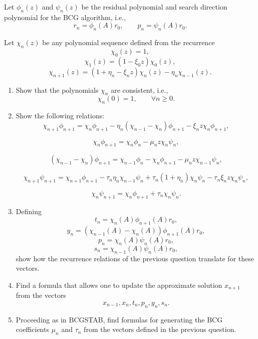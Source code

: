 \documentclass{ctexart}
\begin{document}
\begin{problem}\label{pro:3}
  Let $\phi_n(z)$ and $\psi_n(z)$ be the residual polynomial and search direction polynomial for the BCG algorithm, i.e.,
  \[
    r_n=\phi_n(A)r_0,
    \qquad
    p_n=\psi_n(A)r_0.
  \]

  Let $\chi_n(z)$ be any polynomial sequence defined from the recurrence
  \[
    \chi_0(z)=1,
  \]
  \[
    \chi_1(z)=(1-\xi_0 z)\chi_0(z),
  \]
  \[
    \chi_{n+1}(z)
    =
    (1+\eta_n-\xi_n z)\chi_n(z)-\eta_n\chi_{n-1}(z).
  \]

  \begin{enumerate}[label=(\alph*)]

    \item
      Show that the polynomials $\chi_n$ are consistent, i.e.,
      \[
        \chi_n(0)=1,
        \qquad \forall n\ge0.
      \]

    \item
      Show the following relations:
      \[
        \chi_{n+1}\phi_{n+1}
        =
        \chi_n\phi_{n+1}
        -\eta_n(\chi_{n-1}-\chi_n)\phi_{n+1}
        -\xi_n z\chi_n\phi_{n+1},
      \]

      \[
        \chi_n\phi_{n+1}
        =
        \chi_n\phi_n
        -\mu_n z\chi_n\psi_n,
      \]

      \[
        (\chi_{n-1}-\chi_n)\phi_{n+1}
        =
        \chi_{n-1}\phi_n
        -\chi_n\phi_{n+1}
        -\mu_n z\chi_{n-1}\psi_n,
      \]

      \[
        \chi_{n+1}\psi_{n+1}
        =
        \chi_{n+1}\phi_{n+1}
        -\tau_n\eta_n\chi_{n-1}\psi_n
        +\tau_n(1+\eta_n)\chi_n\psi_n
        -\tau_n\xi_n z\chi_n\psi_n,
      \]

      \[
        \chi_n\psi_{n+1}
        =
        \chi_n\phi_{n+1}
        +\tau_n\chi_n\psi_n.
      \]

    \item
      Defining
      \[
        t_n=\chi_n(A)\phi_{n+1}(A)r_0,
      \]
      \[
        y_n=(\chi_{n-1}(A)-\chi_n(A))\phi_{n+1}(A)r_0,
      \]
      \[
        p_n=\chi_n(A)\psi_n(A)r_0,
      \]
      \[
        s_n=\chi_{n-1}(A)\psi_n(A)r_0,
      \]
      show how the recurrence relations of the previous question translate for these vectors.

    \item
      Find a formula that allows one to update the approximate solution $x_{n+1}$ from the vectors
      \[
        x_{n-1},x_n,t_n,p_n,y_n,s_n.
      \]

    \item
      Proceeding as in BCGSTAB, find formulas for generating the BCG coefficients $\mu_n$ and $\tau_n$ from the vectors defined in the previous question.

  \end{enumerate}
\end{problem}
\end{document}
